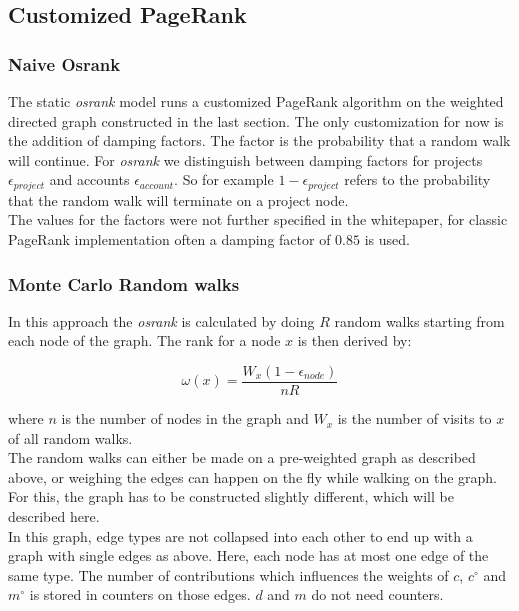 \documentclass{article}
\begin{document}
\subsection{Customized PageRank}
\subsubsection{Naive Osrank}
The static \textit{osrank} model runs a customized PageRank algorithm on
the weighted directed graph constructed in the last section.
The only customization for now is the addition of damping factors.
The factor is the probability that a random walk will continue.
For \textit{osrank} we distinguish between damping factors for projects
$\epsilon_{project}$ and accounts $\epsilon_{account}$. So for example
$1-\epsilon_{project}$ refers to the probability that the random walk will
terminate on a project node.\\
The values for the factors were not further specified in the whitepaper, for
classic PageRank implementation often a damping factor of $0.85$ is used.

\subsubsection{Monte Carlo Random walks}
In this approach the \textit{osrank} is calculated by doing $R$ random walks
starting from each node of the graph. The rank for a node $x$ is then derived by:

\begin{displaymath}
  \omega(x) = \frac{W_x (1-\epsilon_{node})}{n R}
\end{displaymath}

where $n$ is the number of nodes in the graph and $W_x$ is the number of visits
to $x$ of all random walks.\\
The random walks can either be made on a pre-weighted graph as described above,
or weighing the edges can happen on the fly while walking on the graph. For
this, the graph has to be constructed slightly different, which will be
described here.\\
In this graph, edge types are not collapsed into each other to end up with a
graph with single edges as above. Here, each node has at most one edge of the same
type. The number of contributions which influences the weights of $c$,
$c^{\circ}$ and $m^{\circ}$ is stored in counters on those edges. $d$ and $m$ do
not need counters.\\
\end{document}
